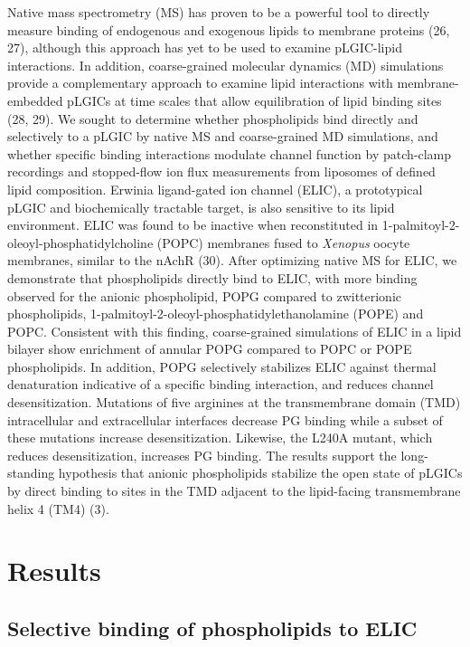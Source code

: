 Native mass spectrometry (MS) has proven to be a powerful tool to
directly measure binding of endogenous and exogenous lipids to membrane
proteins (26, 27), although this approach has yet to be used to examine
pLGIC-lipid interactions. In addition, coarse-grained molecular dynamics
(MD) simulations provide a complementary approach to examine lipid
interactions with membrane-embedded pLGICs at time scales that allow
equilibration of lipid binding sites (28, 29). We sought to determine
whether phospholipids bind directly and selectively to a pLGIC by native
MS and coarse-grained MD simulations, and whether specific binding
interactions modulate channel function by patch-clamp recordings and
stopped-flow ion flux measurements from liposomes of defined lipid
composition. Erwinia ligand-gated ion channel (ELIC), a prototypical
pLGIC and biochemically tractable target, is also sensitive to its lipid
environment. ELIC was found to be inactive when reconstituted in
1-palmitoyl-2-oleoyl-phosphatidylcholine (POPC) membranes fused to
\emph{Xenopus} oocyte membranes, similar to the nAchR (30). After
optimizing native MS for ELIC, we demonstrate that phospholipids
directly bind to ELIC, with more binding observed for the anionic
phospholipid, POPG compared to zwitterionic phospholipids,
1-palmitoyl-2-oleoyl-phosphatidylethanolamine (POPE) and POPC.
Consistent with this finding, coarse-grained simulations of ELIC in a
lipid bilayer show enrichment of annular POPG compared to POPC or POPE
phospholipids. In addition, POPG selectively stabilizes ELIC against
thermal denaturation indicative of a specific binding interaction, and
reduces channel desensitization. Mutations of five arginines at the
transmembrane domain (TMD) intracellular and extracellular interfaces
decrease PG binding while a subset of these mutations increase
desensitization. Likewise, the L240A mutant, which reduces
desensitization, increases PG binding. The results support the
long-standing hypothesis that anionic phospholipids stabilize the open
state of pLGICs by direct binding to sites in the TMD adjacent to the
lipid-facing transmembrane helix 4 (TM4) (3).

\section{Results}

\subsection{Selective binding of phospholipids to ELIC}

